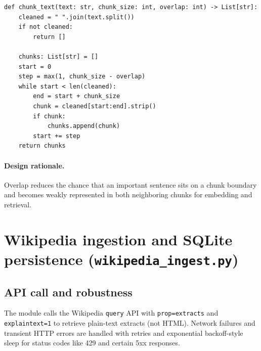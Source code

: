 \documentclass[11pt,a4paper]{article}
\begin{document}
\begin{lstlisting}[caption={Sliding-window chunking with overlap (\texttt{chunking.py}).},label={lst:chunking}]
def chunk_text(text: str, chunk_size: int, overlap: int) -> List[str]:
    cleaned = " ".join(text.split())
    if not cleaned:
        return []

    chunks: List[str] = []
    start = 0
    step = max(1, chunk_size - overlap)
    while start < len(cleaned):
        end = start + chunk_size
        chunk = cleaned[start:end].strip()
        if chunk:
            chunks.append(chunk)
        start += step
    return chunks
\end{lstlisting}

\paragraph{Design rationale.}
Overlap reduces the chance that an important sentence sits on a chunk boundary and becomes
weakly represented in both neighboring chunks for embedding and retrieval.

\section{Wikipedia ingestion and SQLite persistence (\texttt{wikipedia\_ingest.py})}

\subsection{API call and robustness}
The module calls the Wikipedia \texttt{query} API with \texttt{prop=extracts} and
\texttt{explaintext=1} to retrieve plain-text extracts (not HTML). Network failures and
transient HTTP errors are handled with retries and exponential backoff-style sleep for
status codes like 429 and certain 5xx responses.
\end{document}
